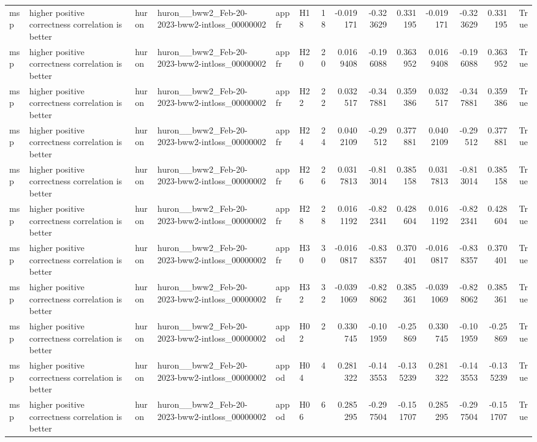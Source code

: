 \begin{longtable}{llllllrrrrrrrr}
msp & higher positive correctness correlation is better & huron & huron\_\_bww2\_Feb-20-2023-bww2-intloss\_00000002 & appfr & H18 & 18 & -0.019171 & -0.323629 & 0.331195 & -0.019171 & -0.323629 & 0.331195 & True \\
msp & higher positive correctness correlation is better & huron & huron\_\_bww2\_Feb-20-2023-bww2-intloss\_00000002 & appfr & H20 & 20 & 0.0169408 & -0.196088 & 0.363952 & 0.0169408 & -0.196088 & 0.363952 & True \\
msp & higher positive correctness correlation is better & huron & huron\_\_bww2\_Feb-20-2023-bww2-intloss\_00000002 & appfr & H22 & 22 & 0.032517 & -0.347881 & 0.359386 & 0.032517 & -0.347881 & 0.359386 & True \\
msp & higher positive correctness correlation is better & huron & huron\_\_bww2\_Feb-20-2023-bww2-intloss\_00000002 & appfr & H24 & 24 & 0.0402109 & -0.29512 & 0.377881 & 0.0402109 & -0.29512 & 0.377881 & True \\
msp & higher positive correctness correlation is better & huron & huron\_\_bww2\_Feb-20-2023-bww2-intloss\_00000002 & appfr & H26 & 26 & 0.0317813 & -0.813014 & 0.385158 & 0.0317813 & -0.813014 & 0.385158 & True \\
msp & higher positive correctness correlation is better & huron & huron\_\_bww2\_Feb-20-2023-bww2-intloss\_00000002 & appfr & H28 & 28 & 0.0161192 & -0.822341 & 0.428604 & 0.0161192 & -0.822341 & 0.428604 & True \\
msp & higher positive correctness correlation is better & huron & huron\_\_bww2\_Feb-20-2023-bww2-intloss\_00000002 & appfr & H30 & 30 & -0.0160817 & -0.838357 & 0.370401 & -0.0160817 & -0.838357 & 0.370401 & True \\
msp & higher positive correctness correlation is better & huron & huron\_\_bww2\_Feb-20-2023-bww2-intloss\_00000002 & appfr & H32 & 32 & -0.0391069 & -0.828062 & 0.385361 & -0.0391069 & -0.828062 & 0.385361 & True \\
msp & higher positive correctness correlation is better & huron & huron\_\_bww2\_Feb-20-2023-bww2-intloss\_00000002 & appod & H02 & 2 & 0.330745 & -0.101959 & -0.25869 & 0.330745 & -0.101959 & -0.25869 & True \\
msp & higher positive correctness correlation is better & huron & huron\_\_bww2\_Feb-20-2023-bww2-intloss\_00000002 & appod & H04 & 4 & 0.281322 & -0.143553 & -0.135239 & 0.281322 & -0.143553 & -0.135239 & True \\
msp & higher positive correctness correlation is better & huron & huron\_\_bww2\_Feb-20-2023-bww2-intloss\_00000002 & appod & H06 & 6 & 0.285295 & -0.297504 & -0.151707 & 0.285295 & -0.297504 & -0.151707 & True \\

\end{longtable}
